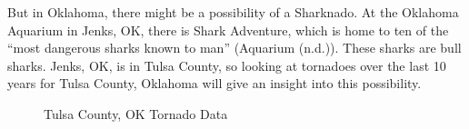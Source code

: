 \documentclass[
  letterpaper,
  DIV=11,
  numbers=noendperiod]{scrreprt}
\begin{document}
But in Oklahoma, there might be a possibility of a Sharknado. At the
Oklahoma Aquarium in Jenks, OK, there is Shark Adventure, which is home
to ten of the ``most dangerous sharks known to man'' (Aquarium (n.d.)).
These sharks are bull sharks. Jenks, OK, is in Tulsa County, so looking
at tornadoes over the last 10 years for Tulsa County, Oklahoma will give
an insight into this possibility.

\begin{figure}


\caption{\label{fig-table7}Tulsa County, OK Tornado Data}

\end{figure}%
\end{document}
